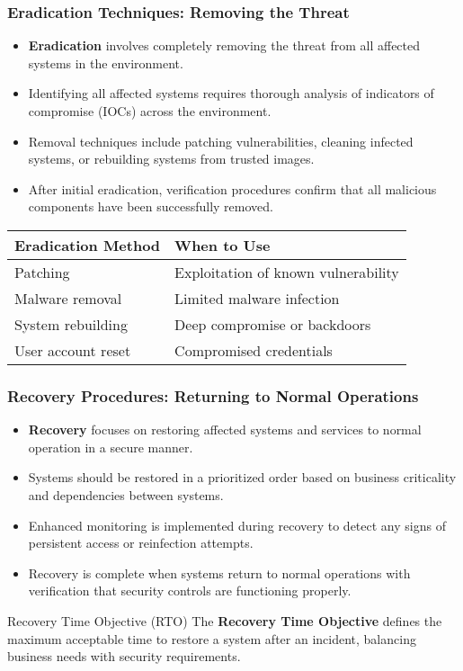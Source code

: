 \documentclass{beamer}
\begin{document}
\begin{frame}
\frametitle{Eradication Techniques: Removing the Threat}
\begin{itemize}
\item \textbf{Eradication} involves completely removing the threat from all affected systems in the environment.
\item Identifying all affected systems requires thorough analysis of indicators of compromise (IOCs) across the environment.
\item Removal techniques include patching vulnerabilities, cleaning infected systems, or rebuilding systems from trusted images.
\item After initial eradication, verification procedures confirm that all malicious components have been successfully removed.
\end{itemize}

\begin{center}
\begin{tabular}{|l|l|}
\hline
\textbf{Eradication Method} & \textbf{When to Use} \\
\hline
Patching & Exploitation of known vulnerability \\
Malware removal & Limited malware infection \\
System rebuilding & Deep compromise or backdoors \\
User account reset & Compromised credentials \\
\hline
\end{tabular}
\end{center}
\end{frame}

\begin{frame}
\frametitle{Recovery Procedures: Returning to Normal Operations}
\begin{itemize}
\item \textbf{Recovery} focuses on restoring affected systems and services to normal operation in a secure manner.
\item Systems should be restored in a prioritized order based on business criticality and dependencies between systems.
\item Enhanced monitoring is implemented during recovery to detect any signs of persistent access or reinfection attempts.
\item Recovery is complete when systems return to normal operations with verification that security controls are functioning properly.
\end{itemize}

\begin{block}{Recovery Time Objective (RTO)}
The \textbf{Recovery Time Objective} defines the maximum acceptable time to restore a system after an incident, balancing business needs with security requirements.
\end{block}
\end{frame}
\end{document}

